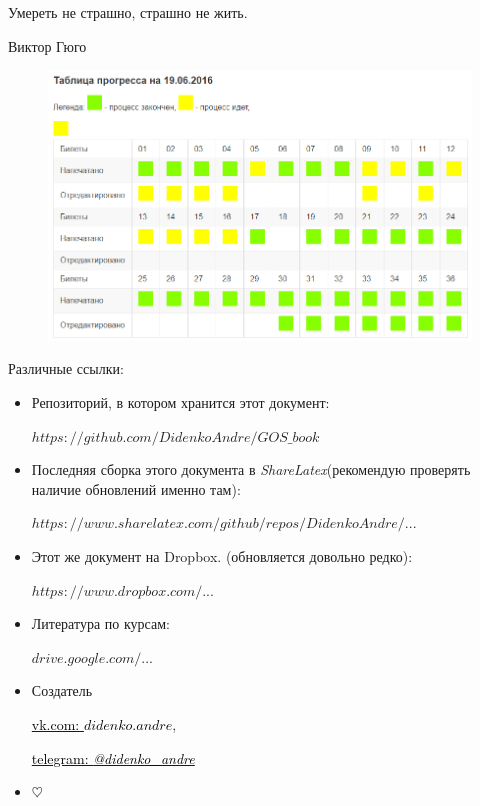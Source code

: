 \epigraph{Умереть не страшно, страшно не жить.}{Виктор Гюго}

\begin{figure}[h!]
\includegraphics[width=\textwidth]{pictures/progress}
\end{figure}

\mbox{}

Различные ссылки:
\begin{itemize}
\item

Репозиторий, в котором хранится этот документ:

\href{https://github.com/DidenkoAndre/GOS_book}{$https://github.com/DidenkoAndre/GOS\_book$}

\item
Последняя сборка этого документа в \textit{ShareLatex}\newline (рекомендую проверять наличие обновлений именно там): 

\href{https://www.sharelatex.com/github/repos/DidenkoAndre/GOS_book/builds/latest/output.pdf}{$https://www.sharelatex.com/github/repos/DidenkoAndre/...$}

\item

Этот же документ на Dropbox.  \newline (обновляется довольно редко):

\href{https://www.dropbox.com/sh/7e5mfj8q68o2ipp/AAD8XvpZhiJzFbEh_IeH305ia?dl=0&preview=GOSMat.pdf}{$https://www.dropbox.com/...$}

\item
Литература по курсам:

\href{https://drive.google.com/drive/u/0/folders/0BzuzEyNkpwYDcENXcV9jNWdwVlU}{$drive.google.com/...$}

\item
Создатель

\href{https://vk.com/didenko.andre}{\textcolor{black}{vk.com: \textcolor{Purplemountainmajesty}{$didenko.andre$}}},

\href{https://telegram.me/didenko_andre}{\textcolor{black}{telegram: \textcolor{Purplemountainmajesty}{\textit{@didenko_andre}}}}

\item

$\heartsuit$
\end{itemize}